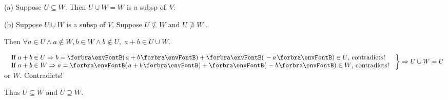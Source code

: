 \documentclass[a4paper, 11pt, UTF8]{article}
\begin{document}
\begin{large}
\par\quad
(a) Suppose $U\subseteq W$. Then $U\cup W=W$ is a subsp of \,$V$.\par\quad
(b) Suppose $U\cup W$ is a subsp of $V$. Suppose $U\not\subseteq W$ and $U\not\supseteq W$ .\par\quad\Hb
Then $\forall a\in U\wedge a\not\in W,b\in W\wedge b\not\in U,\;a+b\in U\cup W$.\par\vspace{6pt}\qquad
$\MathRightBrace{l}{$
If $a+b\in U\Rightarrow b=\Par{a+b}+\Par{-a}\in U$, contradicts!$\\ $
If $a+b\in W\Rightarrow a=\Par{a+b}+\Par{-b}\in W$, contradicts!
$}\Rightarrow U\cup W=U$ or $W.$ Contradicts!\par\vspace{6pt}\quad\Hb
Thus $U\subseteq W$ and $U\supseteq W.$\PfEnd
\SepLine


\end{large}
\end{document}
